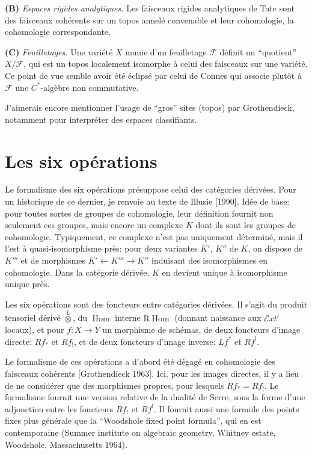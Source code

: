\documentclass[11pt,a4paper]{article}
\theoremstyle{plain}
\theoremstyle{definition}
\DeclareMathOperator{\Hom}{Hom}
\begin{document}
\textbf{(B)} \emph{Espaces rigides analytiques.} Les faisceaux rigides analytiques de Tate sont des faisceaux coh\'erents sur un topos annel\'e convenable et leur cohomologie, la cohomologie correspondante.

\textbf{(C)} \emph{Feuilletages.} Une vari\'et\'e $X$ munie d'un feuilletage $\mathcal{F}$ d\'efinit un ``quotient'' $X/\mathcal{F}$, qui est un topos localement isomorphe \`a celui des faisceaux sur une vari\'et\'e. Ce point de vue semble avoir \'et\'e \'eclips\'e par celui de Connes qui associe plut\^ot \`a $\mathcal{F}$ une $C^*$-alg\`ebre non commutative.

J'aimerais encore mentionner l'usage de ``gros'' sites (topos) par Grothendieck, notamment pour interpr\'eter des espaces classifiants.

\section{Les six op\'erations}

Le formalisme des six op\'erations pr\'esuppose celui des cat\'egories d\'eriv\'ees. Pour un historique de ce dernier, je renvoie au texte de Illusie [1990]. Id\'ee de base: pour toutes sortes de groupes de cohomologie, leur d\'efinition fournit non seulement ces groupes, mais encore un complexe $K$ dont ils sont les groupes de cohomologie. Typiquement, ce complexe n'est pas uniquement d\'etermin\'e, mais il l'est \`a quasi-isomorphisme pr\`es: pour deux variantes $K'$, $K''$ de $K$, on dispose de $K'''$ et de morphismes $K' \leftarrow K''' \rightarrow K''$ induisant des isomorphismes en cohomologie. Dans la cat\'egorie d\'eriv\'ee, $K$ en devient unique \`a isomorphisme unique pr\`es.

Les six op\'erations sont des foncteurs entre cat\'egories d\'eriv\'ees. Il s'agit du produit tensoriel d\'eriv\'e $\overset{L}{\otimes}$, du $\Hom$ interne $\mathrm{R}\!\Hom$ (donnant naissance aux $\mathcal{E}\!\mathit{xt}^i$ locaux), et pour $f \colon X \to Y$ un morphisme de sch\'emas, de deux foncteurs d'image directe: $Rf_*$ et $Rf_!$, et de deux foncteurs d'image inverse: $Lf^*$ et $Rf^!$.

Le formalisme de ces op\'erations a d'abord \'et\'e d\'egag\'e en cohomologie des faisceaux coh\'erents [Grothendieck 1963]. Ici, pour les images directes, il y a lieu de ne consid\'erer que des morphismes propres, pour lesquels $Rf_* = Rf_!$. Le formalisme fournit une version relative de la dualit\'e de Serre, sous la forme d'une adjonction entre les foncteurs $Rf_!$ et $Rf^!$. Il fournit aussi une formule des points fixes plus g\'en\'erale que la ``Woodshole fixed point formula'', qui en est contemporaine (Summer institute on algebraic geometry, Whitney estate, Woodshole, Massachusetts 1964).
\end{document}
